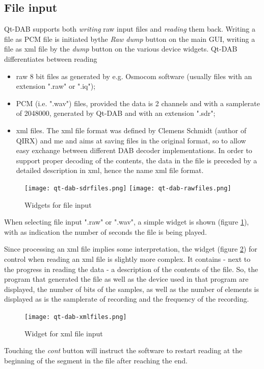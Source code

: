 \documentclass[12pt]{article}
\begin{document}
\subsection{File input}
Qt-DAB supports both {\em writing} raw input files and {\em reading} them back.
Writing a file as PCM file is initiated bythe {\em Raw dump} button on the main GUI,
writing a file as xml file by the {\em dump} button on
the various device widgets.
Qt-DAB differentiates between  reading
\begin{itemize}
\item raw 8 bit files as generated by e.g. Osmocom software (usually
files with an extension ".raw" or ".iq");
\item PCM (i.e. ".wav") files, provided the data is 2 channels and
with a samplerate of 2048000, generated by Qt-DAB and with an extension ".sdr";
\item xml files. The xml file format was defined by Clemens Schmidt
(author of QIRX)
and me and aims at saving files in the original format, so to
allow easy exchange between different DAB decoder implementations.
In order to support proper decoding of the contents, the data in the
file is preceded by a detailed description in xml, hence the name xml file format.
\end{itemize}
\begin{figure}[htp]
\centering
\texttt{[image: qt-dab-sdrfiles.png]}
\texttt{[image: qt-dab-rawfiles.png]}
\caption{Widgets for file input}
\label{figure:fileinput}
\end{figure}

When selecting file input ".raw" or ".wav", a simple widget is shown
(figure \ref{figure:fileinput}),
with as indication the number of seconds the file is being played.

\par
Since processing an xml file implies some interpretation, the
widget (figure \ref{figure:xmlfiles}) for control
when reading an xml file is slightly more complex.
It contains - next to the progress in reading the data - a description
of the contents of the file.
So, the program that generated the file as well as the device used in that
program are displayed, the number of bits of the samples, as well
as the number of elements is displayed as is the samplerate of recording and
the frequency of the recording.
\begin{figure}[htp]
\centering
\texttt{[image: qt-dab-xmlfiles.png]}
\caption{Widget for xml file input}
\label{figure:xmlfiles}
\end{figure}
\par
Touching the {\em cont} button will instruct the software to restart
reading at the beginning of the segment in the file after reaching the end.
\end{document}
